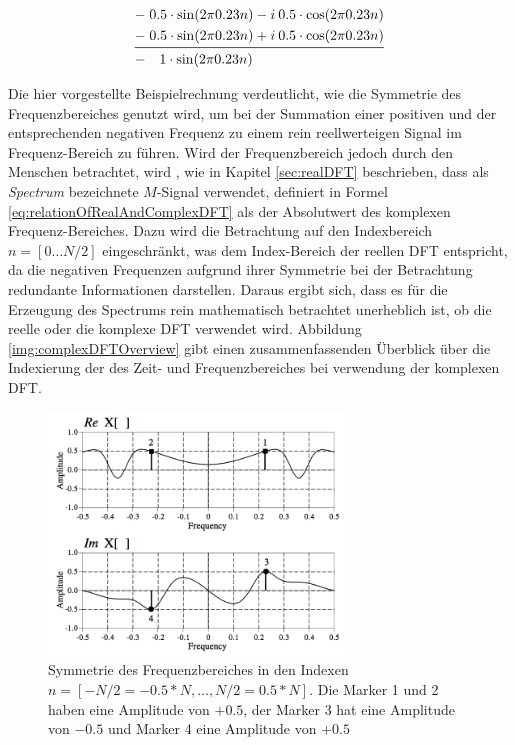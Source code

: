  \begin{equation}
 \begin{split}
-\; 0.5 \cdot \sin(2  \pi 0.23 n) - i \: 0.5 \cdot \cos(2  \pi 0.23 n) \\
-\; 0.5 \cdot \sin(2  \pi 0.23 n) + i \:  0.5 \cdot \cos(2  \pi 0.23 n) \\
\midrule
-\quad 1 \cdot  \sin (2  \pi 0.23 n) \qquad \qquad \qquad \qquad \quad \: \:
 \end{split}
 \label{eq:explainIDFTstep02}
 \end{equation}
 
Die hier vorgestellte Beispielrechnung verdeutlicht, wie die Symmetrie des Frequenzbereiches genutzt wird, um bei der Summation einer positiven und der entsprechenden negativen Frequenz zu einem rein reellwerteigen Signal im Frequenz-Bereich zu führen. Wird der Frequenzbereich jedoch durch den Menschen betrachtet, wird , wie in Kapitel \ref{sec:realDFT} beschrieben, dass als \emph{Spectrum} bezeichnete $M$-Signal verwendet, definiert in Formel \ref{eq:relationOfRealAndComplexDFT} als der Absolutwert des komplexen Frequenz-Bereiches. Dazu wird die Betrachtung auf den Indexbereich $n = [0 \ldots N/2]$ eingeschränkt, was dem Index-Bereich der reellen DFT entspricht, da die negativen Frequenzen aufgrund ihrer Symmetrie bei der Betrachtung redundante Informationen darstellen. Daraus ergibt sich, dass es für die Erzeugung des Spectrums rein mathematisch betrachtet unerheblich ist, ob die reelle oder die komplexe DFT verwendet wird. Abbildung \ref{img:complexDFTOverview} gibt einen zusammenfassenden Überblick über die Indexierung der des Zeit- und Frequenzbereiches bei verwendung der komplexen DFT. \cite[S. 225 - 226]{dspGuide}
 
 \begin{figure}[h]
 	\centering
 	\includegraphics[width=0.7\textwidth]{bilder/dftSymmetrie.png}
 	\caption{Symmetrie des Frequenzbereiches in den Indexen $n = [-N/2 = -0.5*N ,\ldots ,  N/2 = 0.5*N]$. Die Marker 1 und 2 haben eine Amplitude von $+0.5$, der Marker 3 hat eine Amplitude von $-0.5$ und Marker 4 eine Amplitude von $+0.5$ }
 	\label{img:symmetrieInDFT}
 \end{figure} 
 
